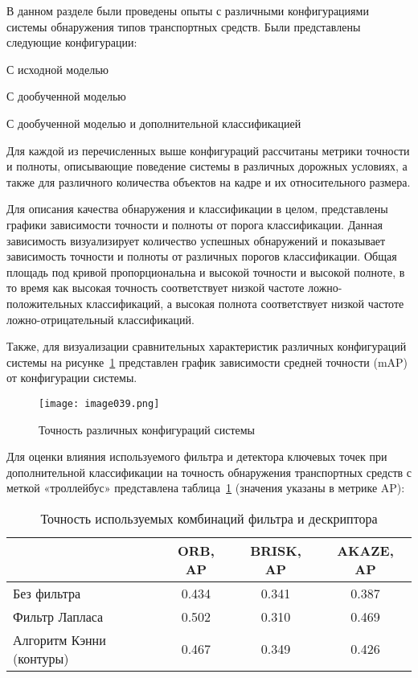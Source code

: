 В данном разделе были проведены опыты с различными конфигурациями системы обнаружения типов транспортных средств. Были представлены следующие конфигурации:

%
\begin{itemize*}
  \item С исходной моделью
  \item С дообученной моделью
  \item С дообученной моделью и дополнительной классификацией	  
\end{itemize*}
%
	
Для каждой из перечисленных выше конфигураций рассчитаны метрики точности и полноты, описывающие поведение системы в различных дорожных условиях, а также для различного количества объектов на кадре и их относительного размера. 

Для описания качества обнаружения и классификации в целом, представлены графики зависимости точности и полноты от порога классификации. Данная зависимость визуализирует количество успешных обнаружений и показывает зависимость точности и полноты от различных порогов классификации. Общая площадь под кривой пропорциональна и высокой точности и высокой полноте, в то время как высокая точность соответствует низкой частоте ложно-положительных классификаций, а высокая полнота соответствует низкой частоте ложно-отрицательный классификаций. 

Также, для визуализации сравнительных характеристик различных конфигураций системы на рисунке~\ref{fig:image039} представлен график зависимости средней точности (mAP) от конфигурации системы.

\begin{figure}[htbp]
\centering
\texttt{[image: image039.png]}
\caption{Точность различных конфигураций системы}%
\label{fig:image039}
\end{figure}

Для оценки влияния используемого фильтра и детектора ключевых точек при дополнительной классификации на точность обнаружения транспортных средств с меткой «троллейбус» представлена таблица~\ref{tabular:tab_5} (значения указаны в метрике AP):

\begin{table}[H]
	\caption{Точность используемых комбинаций фильтра и дескриптора}
	\begin{center}
		\begin{tabular}{|l|c|c|c|}
			\hline
			 & ORB, AP & BRISK, AP & AKAZE, AP\\ \hline
			Без фильтра & 0.434 & 0.341 & 0.387\\ \hline
			Фильтр Лапласа & 0.502 & 0.310 & 0.469\\ \hline
			Алгоритм Кэнни (контуры) & 0.467 & 0.349 & 0.426\\ \hline			
		\end{tabular}
		\label{tabular:tab_5}
	\end{center}
\end{table}

